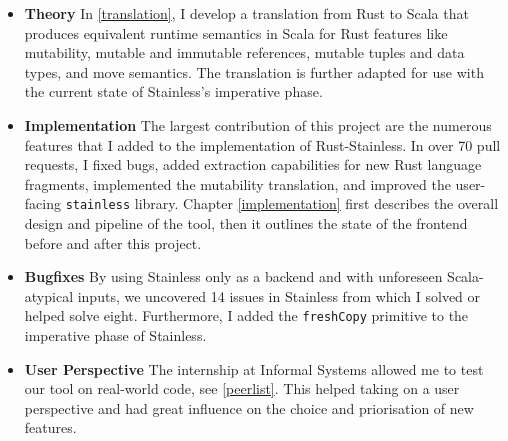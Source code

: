 \begin{itemize}

\item \textbf{Theory} In \autoref{translation}, I develop a translation from
Rust to Scala that produces equivalent runtime semantics in Scala for Rust
features like mutability, mutable and immutable references, mutable tuples and
data types, and move semantics. The translation is further adapted for use with
the current state of Stainless's imperative phase.

\item \textbf{Implementation} The largest contribution of this project are the
numerous features that I added  to the implementation of Rust-Stainless. In over
70 pull requests, I fixed bugs, added extraction capabilities for new Rust
language fragments, implemented the mutability translation, and improved the
user-facing \lstinline!stainless! library. Chapter \ref{implementation} first
describes the overall design and pipeline of the tool, then it outlines the
state of the frontend before and after this project.

\item \textbf{Bugfixes} By using Stainless only as a backend and with unforeseen
Scala-atypical inputs, we uncovered 14 issues in Stainless from which I solved
or helped solve eight. Furthermore, I added the \lstinline!freshCopy! primitive
to the imperative phase of Stainless.

\item \textbf{User Perspective} The internship at Informal Systems allowed me to
test our tool on real-world code, see \autoref{peerlist}. This helped taking on
a user perspective and had great influence on the choice and priorisation of new
features.

\end{itemize}
